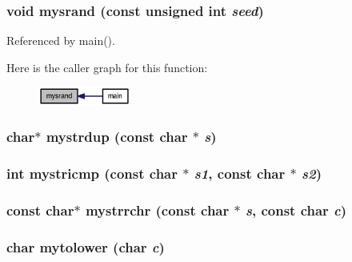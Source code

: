 \subsubsection[{mysrand}]{\setlength{\rightskip}{0pt plus 5cm}void mysrand (const unsigned int {\em seed})}\label{misc_8h_f7918804a6274603680ea16fd10fdc62}




Referenced by main().

Here is the caller graph for this function:\nopagebreak
\begin{figure}[H]
\begin{center}
\leavevmode
\includegraphics[width=86pt]{misc_8h_f7918804a6274603680ea16fd10fdc62_icgraph}
\end{center}
\end{figure}
\subsubsection[{mystrdup}]{\setlength{\rightskip}{0pt plus 5cm}char$\ast$ mystrdup (const char $\ast$ {\em s})}\label{misc_8h_aec695d4d3f73b13b968950d7857116d}


\subsubsection[{mystricmp}]{\setlength{\rightskip}{0pt plus 5cm}int mystricmp (const char $\ast$ {\em s1}, \/  const char $\ast$ {\em s2})}\label{misc_8h_2b5de5706c409f5bb169eafa7ced66d8}


\subsubsection[{mystrrchr}]{\setlength{\rightskip}{0pt plus 5cm}const char$\ast$ mystrrchr (const char $\ast$ {\em s}, \/  const char {\em c})}\label{misc_8h_422c7e3eab812cae01eaa8d33d5c58d3}


\subsubsection[{mytolower}]{\setlength{\rightskip}{0pt plus 5cm}char mytolower (char {\em c})}\label{misc_8h_a400d7148b23b4458a7dd87fc590d780}




